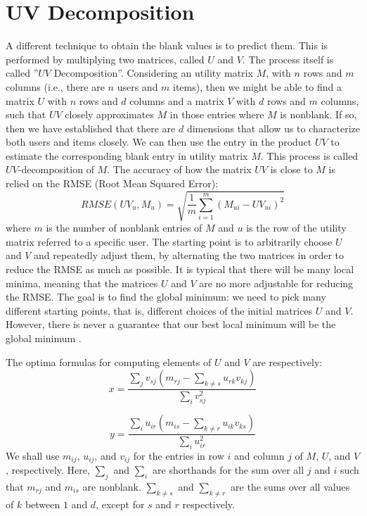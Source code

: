 \documentclass{article}
\begin{document}
\section{UV Decomposition}
A different technique to obtain the blank values is to predict them. This is performed by multiplying two matrices, called $U$ and $V$. The process itself is called ''$UV$ Decomposition''. Considering an utility matrix $M$, with $n$ rows and $m$ columns (i.e., there are $n$ users and $m$ items), then we might be able to find a matrix $U$ with $n$ rows and $d$ columns and a matrix $V$ with $d$ rows and $m$ columns, such that $UV$ closely approximates $M$ in those entries where $M$ is nonblank. If so, then we have established that there are $d$ dimensions that allow us to characterize both users and items closely. We can then use the entry in the product $UV$ to estimate the corresponding blank entry in utility matrix $M$. This process is called $UV$-decomposition of $M$.
The accuracy of how the matrix $UV$ is close to $M$ is relied on the RMSE (Root Mean Squared Error): 
$$
    RMSE(UV_u,M_u) = \sqrt{\frac{1}{m}\sum_{i = 1}^m (M_{ui}-UV_{ui})^2}
$$ %
where $m$ is the number of nonblank entries of $M$ and $u$ is the row of the utility matrix referred to a specific user.
The starting point is to arbitrarily choose $U$ and $V$ and repeatedly adjust them, by alternating the two matrices in order to reduce the RMSE as much as possible. It is typical that there will be many local minima, meaning that the matrices $U$ and $V$ are no more adjustable for reducing the RMSE. The goal is to find the global minimum: we need to pick many different starting points, that is, different choices of the initial matrices $U$ and $V$. However, there is never a guarantee that our best local minimum will be the global minimum \cite{leskovec2020mining}.

The optima formulas for computing elements of $U$ and $V$ are respectively:
$$
    x = \frac{\sum_j v_{sj}(m_{rj} - \sum_{k\neq s} u_{rk}v_{kj})}{\sum_i v_{sj}^2}
$$

$$
    y = \frac{\sum_i u_{ir}(m_{is} - \sum_{k\neq r} u_{ik}v_{ks})}{\sum_i u_{ir}^2}
$$
We shall use $m_{ij}$, $u_{ij}$, and $v_{ij}$ for the entries in row $i$ and column $j$ of $M$, $U$, and $V$, respectively.
Here, $\sum_j$ and $\sum_i$ are shorthands for the sum over all $j$ and $i$ such that $m_{rj}$ and $m_{is}$ are nonblank. $\sum_{k \neq s}$ and $\sum_{k \neq r}$ are the sums over all values of $k$ between $1$ and $d$, except for $s$ and $r$ respectively. 
\end{document}
